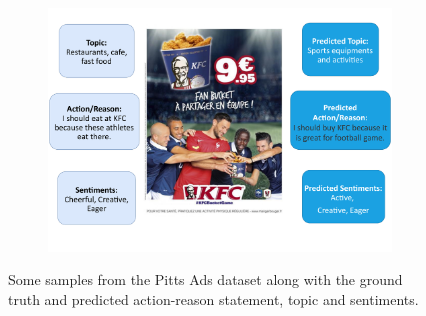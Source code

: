 \begin{figure}[!h]
\begin{subfigure}[b]{0.49\textwidth}
         \caption{}
         \label{fig:preds-sup-2}
     \end{subfigure}
     \begin{subfigure}[b]{0.49\textwidth}
         \centering
         \includegraphics[width=\textwidth,scale=0.68]{images/preds_sup_8.pdf}
         \caption{}
         \label{fig:preds-sup-8}
     \end{subfigure}
    \caption{Some samples from the Pitts Ads dataset along with the ground truth and predicted action-reason statement, topic and sentiments.}
    \label{fig:preds-sup}
\end{figure}


